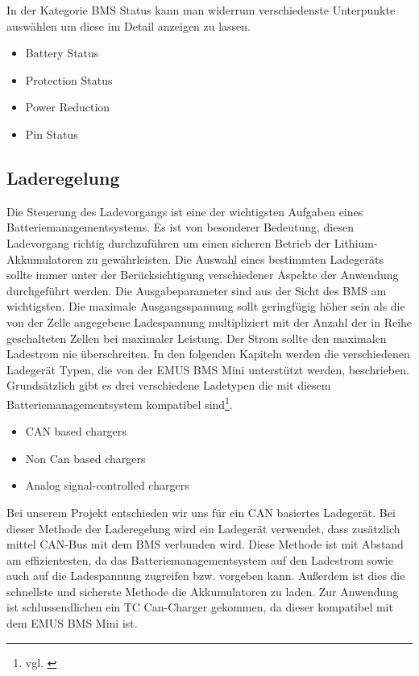 In der Kategorie BMS Status kann man widerrum verschiedenste Unterpunkte auswählen um diese im Detail anzeigen zu lassen.

\begin{itemize}
\item{Battery Status}\\
\item{Protection Status}\\
\item{Power Reduction}\\
\item{Pin Status}\\
\end{itemize}
\newpage

\subsection{Laderegelung}
Die Steuerung des Ladevorgangs ist eine der wichtigsten Aufgaben eines Batteriemanagementsystems. Es ist von besonderer Bedeutung, diesen Ladevorgang richtig durchzuführen um einen sicheren Betrieb der Lithium-Akkumulatoren zu gewährleisten. Die Auswahl eines bestimmten Ladegeräts sollte immer unter der Berücksichtigung verschiedener Aspekte der Anwendung durchgeführt werden. Die Ausgabeparameter sind aus der Sicht des BMS am wichtigsten. Die maximale Ausgangsspannung sollt geringfügig höher sein als die von der Zelle angegebene Ladespannung multipliziert mit der Anzahl der in Reihe geschalteten Zellen bei maximaler Leistung. Der Strom sollte den maximalen Ladestrom nie überschreiten. In den folgenden Kapiteln werden die verschiedenen Ladegerät Typen, die von der EMUS BMS Mini unterstützt werden, beschrieben.
Grundsätzlich gibt es drei verschiedene Ladetypen die mit diesem Batteriemanagementsystem kompatibel sind\footnote{vgl. \cite{Laderegelung}}.

\begin{itemize}
\item{CAN based chargers}\\
\item{Non Can based chargers}\\
\item{Analog signal-controlled chargers}\\
\end{itemize}

Bei unserem Projekt entschieden wir uns für ein CAN basiertes Ladegerät. Bei dieser Methode der Laderegelung wird ein Ladegerät verwendet, dass zusätzlich mittel CAN-Bus mit dem BMS verbunden wird. Diese Methode ist mit Abstand am effizientesten, da das Batteriemanagementsystem auf den Ladestrom sowie auch auf die Ladespannung zugreifen bzw. vorgeben kann. Außerdem ist dies die schnellste und sicherste Methode die Akkumulatoren zu laden. Zur Anwendung ist schlussendlichen ein TC Can-Charger gekommen, da dieser kompatibel mit dem EMUS BMS Mini ist.
\newpage

